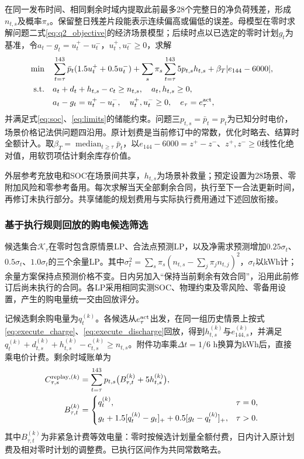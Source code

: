 在同一发布时间、相同剩余时域内提取此前最多28个完整日的净负荷残差，形成$n_{t,s}$及概率$\pi_s$。保留整日残差片段能表示连续偏高或偏低的误差。母模型在零时求解问题二式\eqref{eq:q2_objective}的经济场景模型；后续时点以已选定的零时计划$g_t$为基准，令$a_t-g_t=u_t^+-u_t^-$，$u_t^+,u_t^-\ge0$，求解
\begin{align}
 \min\quad &\sum_{t=\tau}^{143}\bar p_t(1.5u_t^++0.5u_t^-)
 +\sum_s\pi_s\sum_{t=\tau}^{143}5p_{t,s}h_{t,s}
 +\beta_T|e_{144}-6000|,\label{eq:q3_revision_objective}\\
 \text{s.t.}\quad&a_t+d_t+h_{t,s}-c_t\ge n_{t,s},\quad a_t,h_{t,s}\ge0,
                    \label{eq:q3_revision_balance}\\
 &a_t-g_t=u_t^+-u_t^-,\quad u_t^+,u_t^-\ge0,\quad
 e_\tau=e_\tau^{\rm act},\label{eq:q3_revision_contract}
\end{align}
并满足式\eqref{eq:soc}、\eqref{eq:limits}的储能约束。问题三$p_{t,s}=\bar p_t=p_t$为已知分时电价，场景价格记法供问题四沿用。原计划费是当前修订中的常数，优化时略去、结算时全额计入。取$\beta_T=\operatorname{median}_{t\ge\tau}\bar p_t$，以$e_{144}-6000=z^+-z^-$、$z^+,z^-\ge0$线性化绝对值，用软罚项估计剩余库存价值。

外层参考充放电和SOC在场景间共享，$h_{t,s}$为场景补救量；预定设置为28场景、零附加风险和零参考备用。每次求解当天全部剩余合同，执行至下一合法更新时间，再修订未执行部分。共享储能的规划费用与实际执行费用通过下述回放衔接。

\subsubsection{基于执行规则回放的购电候选筛选}
\label{sec:q3_candidate_screening}

候选集合$\mathcal K_\tau$在零时包含原情景LP、合法点预测LP，以及净需求预测增加$0.25\sigma_t$、$0.5\sigma_t$、$1.0\sigma_t$的三个余量LP。其中$\sigma_t^2=\sum_s\pi_s(n_{t,s}-\sum_j\pi_jn_{t,j})^2$，$\sigma_t$以kWh计；余量方案保持点预测价格不变。日内另加入“保持当前剩余有效合同”，沿用此前修订后尚未执行的合同。各LP采用相同实测SOC、物理约束及零风险、零备用设置，产生的购电量统一交由回放评分。

记候选剩余购电量为$q_t^{(k)}$。各候选从$e_\tau^{\rm act}$出发，在同一组历史情景上按式\eqref{eq:execute_charge}、\eqref{eq:execute_discharge}回放，得到$h_{t,s}^{(k)}$与$e_{144,s}^{(k)}$，并满足$q_t^{(k)}+d_{t,s}^{(k)}+h_{t,s}^{(k)}-c_{t,s}^{(k)}\ge n_{t,s}$。附件功率乘$\Delta t=1/6$ h换算为kWh后，直接乘电价计费。剩余时域账单为
\begin{align}
 C_{\tau,s}^{\mathrm{replay},(k)}
 &=\sum_{t=\tau}^{143}p_{t,s}\bigl(B_{\tau,t}^{(k)}+5h_{t,s}^{(k)}\bigr),
 \label{eq:q3_replay_bill}\\
 B_{\tau,t}^{(k)}&=
 \begin{cases}
 q_t^{(k)},&\tau=0,\\[1ex]
 g_t+1.5[q_t^{(k)}-g_t]_++0.5[g_t-q_t^{(k)}]_+,&\tau>0.
 \end{cases}\notag
\end{align}
其中$B_{\tau,t}^{(k)}$为非紧急计费等效电量：零时按候选计划量全额付费，日内计入原计划费及相对零时计划的调整费。已执行区间作为共同常数略去。

